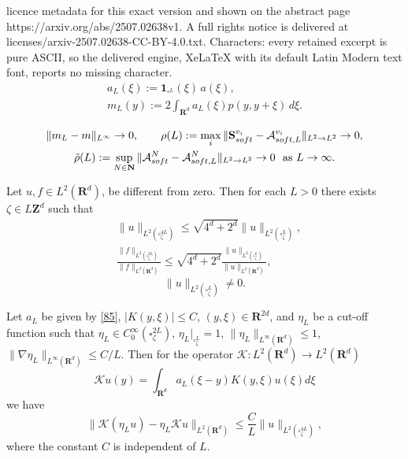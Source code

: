 \documentclass[10pt,a4paper]{amsart}
\def\RR{\R}
\newcommand\soft{{\rm soft}}
\newcommand{\R}{\mathbf{R}}
\renewcommand\AA{{\mathbf S}}
\begin{document}
licence metadata for this exact version and shown on the abstract page https://arxiv.org/abs/2507.02638v1. A full rights notice is delivered at licenses/arxiv-2507.02638-CC-BY-4.0.txt. Characters: every retained excerpt is pure ASCII, so the delivered engine, XeLaTeX with its default Latin Modern text font, reports no missing character.
\begin{equation}\label{85}
	\begin{gathered}
	a_L(\xi):=\mathbf{1}_{\square^{L}}(\xi)\,a(\xi),
\\
m_L(y):=2\int_{\R^d} a_L(\xi) p(y,y+\xi)\,d\xi.
\end{gathered}
\end{equation}

\begin{equation} \label{defeta}
	\begin{gathered}
		\|m_L-m\|_{L^\infty} \to 0,\qquad \rho(L):=\max_i \|\AA_\soft ^{v_i}-\mathcal{A}_{\soft,L}^{v_i}\|_{L^2 \to L^2} \to 0,
	\\
		\tilde{\rho}(L):=\sup_{N \in \mathbf{N}} \|\mathcal{A}^N_\soft-\mathcal{A}_{\rm soft,L}^N\|_{L^2 \to L^2} \to 0
		\ \ \hbox{as }L \to \infty.
	\end{gathered}
\end{equation}

\begin{proposition} \label{cetprop1}
Let $u,f \in L^2(\mathbf{R}^d)$,  be different from zero. 	Then for each $L>0$ there exists $\zeta \in L \mathbf{Z}^d$ such that
	\begin{equation}
		\begin{aligned}
			&{\|u\|_{L^2(\square^{4L}_\zeta)}} \leq  \sqrt{4^d+  2^d}   {\| u\|_{L^2(\square^{L}_\zeta)}},
			\\
		&	\frac{\|  f\|_{L^2(\square^{2L}_\zeta)}}{\|f\|_{L^2(\RR^d)}}\leq \sqrt{4^d+  2^d}  \frac{\| u \|_{L^2(\square^L_\zeta)}}{\|u\|_{L^2(\RR^d)}},  \label{prd1} 	
		\end{aligned}
		 \end{equation}
		 \begin{equation*}
		 	\|  u \|_{L^2(\square^L_\zeta)} \neq 0.
		 \end{equation*}
		
	
\end{proposition} 	

\begin{proposition}\label{p5.4}
 Let $a_L$ be given by \eqref{85},  $|K(y,\xi)|\leq C$, $(y,\xi)\in \R^{2d}$,  and $\eta_L$ be a cut-off function such that $\eta_L \in C_0^{\infty}(\square^{2L}_{\zeta})$, $\eta_L|_{\square^L_{\zeta}}=1$, $\|\eta_L\|_{L^{\infty}(\RR^d)}\leq 1$, $\|\nabla \eta_L\|_{L^{\infty}(\RR^d)} \leq C/L$.
Then for the operator $\mathcal{K}: L^2(\R^d) \to L^2(\R^d)$
$$
\mathcal{K} u(y) = \int_{\R^d} a_L (\xi-y) K(y,\xi)u(\xi) d\xi
$$
we have
\begin{equation*}%
\|\mathcal{K} (\eta_L u)  - \eta_L    \mathcal{K} u \|_{L^2(\R^d)} \leq \frac{C}{L}\| u \|_{L^2(\square^{4L}_{\zeta})},	
\end{equation*}
where the constant $C$ is independent of $L$.
\end{proposition}
\end{document}
